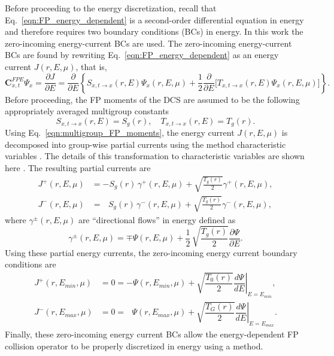 Before proceeding to the \dG energy discretization, recall that Eq.~\eqref{eqn:FP_energy_dependent} is a second-order differential equation in energy and therefore requires two boundary conditions (BCs) in energy. In this work the zero-incoming energy-current BCs are used. The zero-incoming energy-current BCs are found by rewriting Eq.~\eqref{eqn:FP_energy_dependent} as an energy current $J(r,E,\mu)$, that is,
\begin{equation}
    \boldsymbol{C}_{x,t}^{FPE} \Psi_x = \dfrac{\partial J}{\partial E} = \dfrac{\partial}{\partial E} \left\lbrace S_{x,t\rightarrow x}(r,E) \Psi_x(r,E,\mu)  + \dfrac{1}{2} \dfrac{\partial}{\partial E} \Big[ T_{x,t\rightarrow x}(r,E) \Psi_x(r,E,\mu) \Big] \right\rbrace.
\end{equation}
Before proceeding, the FP moments of the DCS are assumed to be the following appropriately averaged multigroup constants
\begin{equation} \label{eqn:multigroup_FP_moments}
    S_{x,t\rightarrow x}(r,E) = S_g(r), \quad T_{x,t\rightarrow x}(r,E) = T_g(r).
\end{equation}
Using Eq.~\eqref{eqn:multigroup_FP_moments}, the energy current $J(r,E,\mu)$ is decomposed into group-wise partial currents using the method characteristic variables \cite{Warsa-2002}. The details of this transformation to characteristic variables are shown here \cite{Beling-2021}. The resulting partial currents are
\begin{subequations}
    \begin{align}
        J^+(r,E,\mu) &= -S_g(r) \, \gamma^+(r,E,\mu) + \sqrt{\frac{T_g(r)}{2}} \gamma^+(r,E,\mu), \\
        J^-(r,E,\mu) &=  \,\,\,\,S_g(r) \, \gamma^-(r,E,\mu) + \sqrt{\frac{T_g(r)}{2}} \gamma^-(r,E,\mu),
    \end{align}
\end{subequations}
where $\gamma^{\pm}(r,E,\mu)$ are ``directional flows'' in energy defined as
\begin{equation}
    \gamma^{\pm}(r,E,\mu) = \mp \Psi(r,E,\mu) + \dfrac{1}{2} \, \sqrt{\frac{T_g(r)}{2}} \dfrac{\partial \Psi}{\partial E}.
\end{equation}
Using these partial energy currents, the zero-incoming energy current boundary conditions are
\begin{subequations} \label{eqn:Fokker-Planck-BCS}
    \begin{align}
        J^+(r,E_{min},\mu) &= 0 = - \Psi(r,E_{min},\mu) + \sqrt{\dfrac{T_{0}(r)}{2}} \left.\dfrac{d \Psi}{dE}\right|_{E=E_{min}}, \\
        J^-(r,E_{max},\mu) &= 0 = \,\,\,\, \Psi(r,E_{max},\mu) + \sqrt{\dfrac{T_G(r)}{2}} \left.\dfrac{d \Psi}{dE}\right|_{E=E_{max}}.
    \end{align}
\end{subequations}
Finally, these zero-incoming energy current BCs allow the energy-dependent FP collision operator to be properly discretized in energy using a \dG method. 

